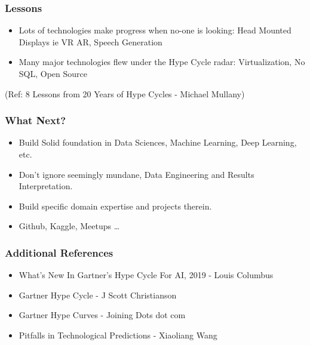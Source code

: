 \begin{frame}[fragile]\frametitle{Lessons}


\begin{itemize}
\item Lots of technologies make progress when no-one is looking: Head Mounted Displays ie VR AR, Speech Generation
\item  Many major technologies flew under the Hype Cycle radar: Virtualization, No SQL, Open Source
\end{itemize}


{\tiny (Ref: 8 Lessons from 20 Years of Hype Cycles - Michael Mullany)}

\end{frame}


\begin{frame}[fragile]\frametitle{What Next?}


\begin{itemize}
\item Build Solid foundation in Data Sciences, Machine Learning, Deep Learning, etc.
\item Don't ignore seemingly mundane, Data Engineering and Results Interpretation.
\item Build specific domain expertise and projects therein.
\item Github, Kaggle, Meetups \ldots
\end{itemize}

\end{frame}


\begin{frame}[fragile]\frametitle{Additional References}


\begin{itemize}
\item What's New In Gartner's Hype Cycle For AI, 2019 - Louis Columbus
\item Gartner Hype Cycle - J Scott Christianson
\item Gartner Hype Curves - Joining Dots dot com
\item Pitfalls in Technological Predictions - Xiaoliang Wang
\end{itemize}

\end{frame}


